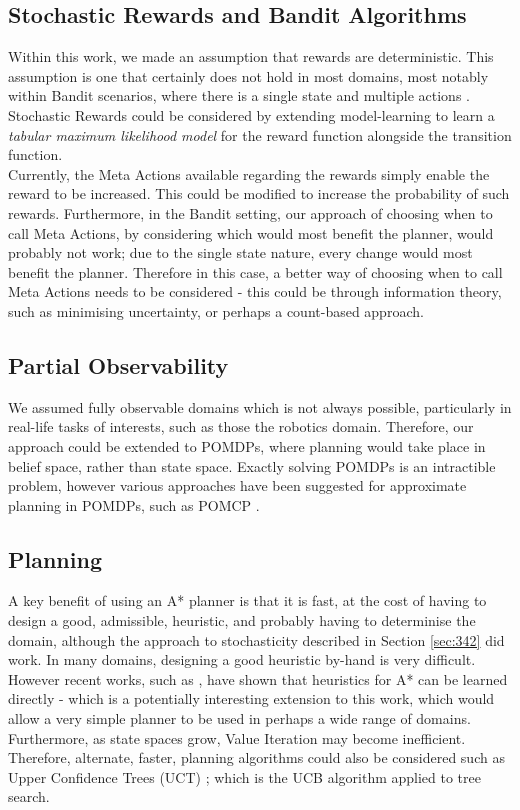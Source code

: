 \subsection{Stochastic Rewards and Bandit Algorithms}
Within this work, we made an assumption that rewards are deterministic. This assumption is one that certainly does not hold in most domains, most notably within Bandit scenarios, where there is a single state and multiple actions \citep{lattimore}. Stochastic Rewards could be considered by extending model-learning to learn a \textit{tabular maximum likelihood model} for the reward function alongside the transition function.
\\Currently, the Meta Actions available regarding the rewards simply enable the reward to be increased. This could be modified to increase the probability of such rewards. Furthermore, in the Bandit setting, our approach of choosing when to call Meta Actions, by considering which would most benefit the planner, would probably not work; due to the single state nature, every change would most benefit the planner. Therefore in this case, a better way of choosing when to call Meta Actions needs to be considered - this could be through information theory, such as minimising uncertainty, or perhaps a count-based approach.
\subsection{Partial Observability}
We assumed fully observable domains which is not always possible, particularly in real-life tasks of interests, such as those the robotics domain. Therefore, our approach could be extended to POMDPs, where planning would take place in belief space, rather than state space. Exactly solving POMDPs is an intractible problem, however various approaches have been suggested for approximate planning in POMDPs, such as POMCP \cite{NIPS2010_edfbe1af}.
\subsection{Planning}
A key benefit of using an A* planner is that it is fast, at the cost of having to design a good, admissible, heuristic, and probably having to determinise the domain, although the approach to stochasticity described in Section \ref{sec:342} did work. 
In many domains, designing a good heuristic by-hand is very difficult. However recent works, such as \cite{DBLP:journals/corr/abs-2107-02603}, have shown that heuristics for A* can be learned directly - which is a potentially interesting extension to this work, which would allow a very simple planner to be used in perhaps a wide range of domains. Furthermore, as state spaces grow, Value Iteration may become inefficient. Therefore, alternate, faster, planning algorithms could also be considered such as Upper Confidence Trees (UCT) \cite{10.1007/11871842_29}; which is the UCB algorithm \cite{auer2002finite} applied to tree search.
